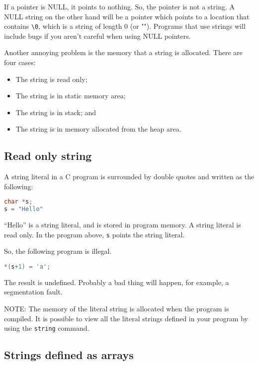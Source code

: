 If a pointer is NULL, it points to nothing. So, the pointer is not a
string. A NULL string on the other hand will be a pointer which points
to a location that contains \passthrough{\lstinline!\\0!}, which is a
string of length 0 (or ""). Programs that use strings will include bugs
if you aren't careful when using NULL pointers.

Another annoying problem is the memory that a string is allocated. There
are four cases:

\begin{itemize}
\tightlist
\item
  The string is read only;
\item
  The string is in static memory area;
\item
  The string is in stack; and
\item
  The string is in memory allocated from the heap area.
\end{itemize}

\hypertarget{read-only-string}{%
\subsection{Read only string}\label{read-only-string}}

A string literal in a C program is surrounded by double quotes and
written as the following:

\begin{lstlisting}[language=C]
char *s;
s = "Hello"
\end{lstlisting}

``Hello'' is a string literal, and is stored in program memory. A string
literal is read only. In the program above, \passthrough{\lstinline!s!}
points the string literal.

So, the following program is illegal.

\begin{lstlisting}[language=C]
*(s+1) = 'a';
\end{lstlisting}

The result is undefined. Probably a bad thing will happen, for example,
a segmentation fault.

NOTE: The memory of the literal string is allocated when the program is
compiled. It is possible to view all the literal strings defined in your
program by using the \passthrough{\lstinline!string!} command.

\hypertarget{strings-defined-as-arrays}{%
\subsection{Strings defined as arrays}\label{strings-defined-as-arrays}}

